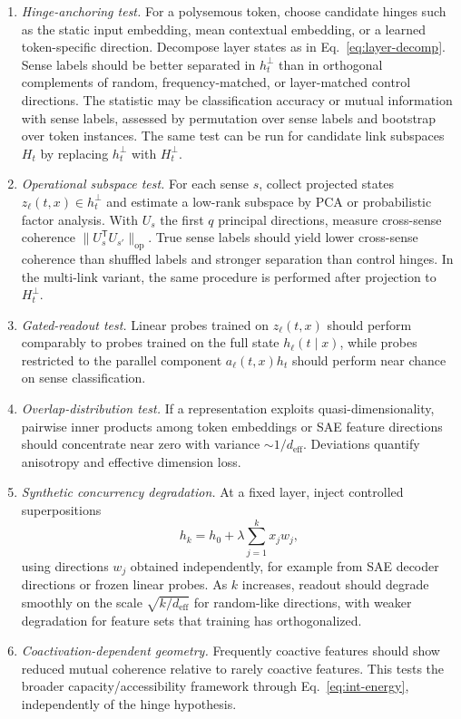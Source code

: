 \documentclass[
  aps,
  reprint,
  superscriptaddress,
  floatfix,
  nofootinbib,
  longbibliography
]{revtex4-2}
\newcommand{\deff}{d_{\mathrm{eff}}}
\newcommand{\T}{^{\mathsf{T}}}
\newcommand{\opnorm}[1]{\lVert #1 \rVert_{\mathrm{op}}}
\begin{document}
\begin{enumerate}
\item \emph{Hinge-anchoring test.}
For a polysemous token, choose candidate hinges such as the static input
embedding, mean contextual embedding, or a learned token-specific
direction. Decompose layer states as in Eq.~\eqref{eq:layer-decomp}.
Sense labels should be better separated in $h_t^\perp$ than in
orthogonal complements of random, frequency-matched, or layer-matched
control directions. The statistic may be classification accuracy or
mutual information with sense labels, assessed by permutation over
sense labels and bootstrap over token instances. The same test can be
run for candidate link subspaces $H_t$ by replacing $h_t^\perp$ with
$H_t^\perp$.

\item \emph{Operational subspace test.}
For each sense $s$, collect projected states
$z_\ell(t,x)\in h_t^\perp$ and estimate a low-rank subspace by PCA or
probabilistic factor analysis. With $U_s$ the first $q$ principal
directions, measure cross-sense coherence
$\opnorm{U_s\T U_{s'}}$. True sense labels should yield lower
cross-sense coherence than shuffled labels and stronger separation than
control hinges. In the multi-link variant, the same procedure is
performed after projection to $H_t^\perp$.

\item \emph{Gated-readout test.}
Linear probes trained on $z_\ell(t,x)$ should perform comparably to
probes trained on the full state $h_\ell(t\mid x)$, while probes
restricted to the parallel component $a_\ell(t,x)h_t$ should perform
near chance on sense classification.

\item \emph{Overlap-distribution test.}
If a representation exploits quasi-dimensionality, pairwise inner
products among token embeddings or SAE feature directions should
concentrate near zero with variance $\sim1/\deff$. Deviations quantify
anisotropy and effective dimension loss.

\item \emph{Synthetic concurrency degradation.}
At a fixed layer, inject controlled superpositions
%
\begin{equation}
h_k=h_0+\lambda\sum_{j=1}^k x_j w_j,
\end{equation}
%
using directions $w_j$ obtained independently, for example from SAE
decoder directions or frozen linear probes. As $k$ increases, readout
should degrade smoothly on the scale $\sqrt{k/\deff}$ for random-like
directions, with weaker degradation for feature sets that training has
orthogonalized.

\item \emph{Coactivation-dependent geometry.}
Frequently coactive features should show reduced mutual coherence
relative to rarely coactive features. This tests the broader
capacity/accessibility framework through Eq.~\eqref{eq:int-energy},
independently of the hinge hypothesis.
\end{enumerate}
\end{document}
